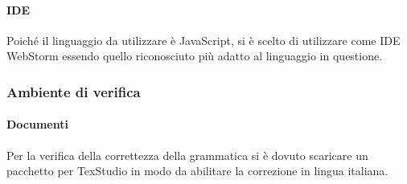                            \paragraph{IDE}
                                Poiché il linguaggio da utilizzare è JavaScript, si è scelto di utilizzare come IDE WebStorm essendo quello riconosciuto più adatto al linguaggio in questione.
                        \subsubsection{Ambiente di verifica}
                            \paragraph{Documenti} 
                                Per la verifica della correttezza della grammatica si è dovuto scaricare un pacchetto per TexStudio in modo da abilitare la correzione in lingua italiana.
                           


                                 
                             
           
                         
                
                    
                     
                
            
    
     
            
            